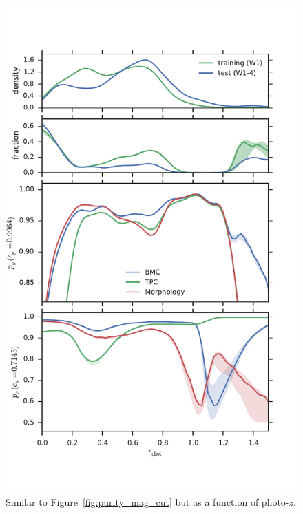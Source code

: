 \documentclass[useAMS,usenatbib]{mn2e}
\begin{document}
\begin{figure}
  \centering
  \includegraphics[width=\columnwidth]{figures/purity_z_cut.pdf}
  \caption{Similar to Figure~\ref{fig:purity_mag_cut}
           but as a function of photo-$z$.}
  \label{fig:purity_z_cut}
\end{figure}
\end{document}
